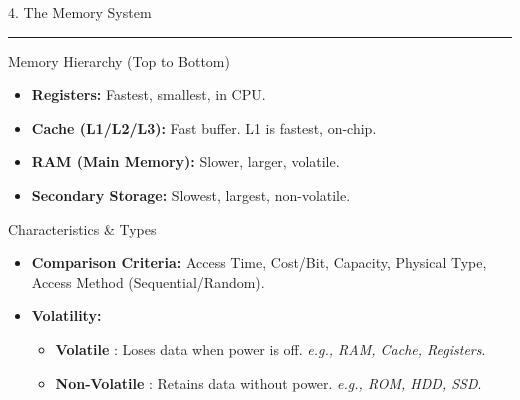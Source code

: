 \documentclass[a4paper, 8pt]{extarticle}
\newcommand{\sectionheading}[1]{%
  \par\vspace{0.6em} %
  {\headingfont\fontsize{10.5pt}{11.5pt}\selectfont\color{black}#1}\par\nopagebreak
  \rule{\linewidth}{0.4pt}\vspace{0.2em}\nopagebreak
}
\newcommand{\subsectionheading}[1]{%
  \par\vspace{0.3em}\nopagebreak
  {\headingfont\fontsize{9pt}{10pt}\selectfont\color{black!80}#1}\par\nopagebreak\vspace{-0.3em}
}
\begin{document}
\begin{multicols}{2}
\sectionheading{4. The Memory System}
\subsectionheading{Memory Hierarchy (Top to Bottom)}
\begin{itemize}
    \item[\textbf{1.}] \textbf{Registers:} Fastest, smallest, in CPU.
    \item[\textbf{2.}] \textbf{Cache (L1/L2/L3):} Fast buffer. L1 is fastest, on-chip.
    \item[\textbf{3.}] \textbf{RAM (Main Memory):} Slower, larger, volatile.
    \item[\textbf{4.}] \textbf{Secondary Storage:} Slowest, largest, non-volatile.
\end{itemize}
\vspace{0.3em}
\subsectionheading{Characteristics \& Types}
\begin{itemize}
    \item \textbf{Comparison Criteria:} Access Time, Cost/Bit, Capacity, Physical Type, Access Method (Sequential/Random).
    \item \textbf{Volatility:}
        \begin{itemize}
            \item \textbf{Volatile} : Loses data when power is off. \textit{e.g., RAM, Cache, Registers}.
            \item \textbf{Non-Volatile} : Retains data without power. \textit{e.g., ROM, HDD, SSD}.
        \end{itemize}
\end{itemize}


\end{multicols}
\end{document}
